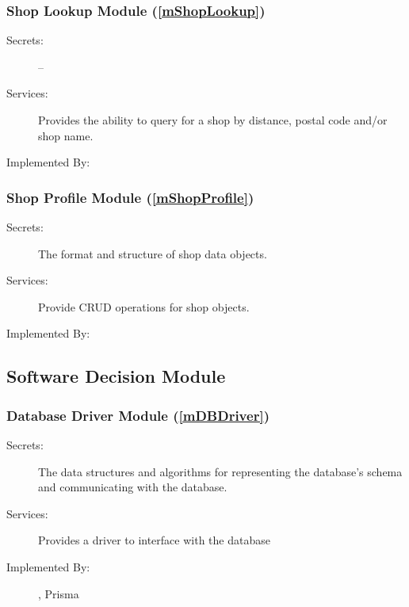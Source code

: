 \documentclass[12pt, titlepage]{article}
\begin{document}
\subsubsection{Shop Lookup Module (\ref{mShopLookup})}

\begin{description}
	\item[Secrets:] --
	\item[Services:] Provides the ability to query for a shop by distance, postal code and/or shop name.
	\item[Implemented By:] \progname{}
\end{description}

\subsubsection{Shop Profile Module (\ref{mShopProfile})}

\begin{description}
	\item[Secrets:] The format and structure of shop data objects.
	\item[Services:] Provide CRUD operations for shop objects.
	\item[Implemented By:] \progname{}
\end{description}

\subsection{Software Decision Module}


\subsubsection{Database Driver Module (\ref{mDBDriver})}
\begin{description}
	\item[Secrets:] The data structures and algorithms for representing the database's schema and
		communicating with the database.
	\item[Services:] Provides a driver to interface with the database
	\item[Implemented By:] \progname{}, Prisma
\end{description}
\end{document}

